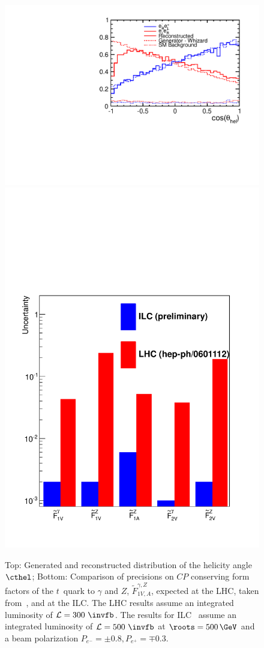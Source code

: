 \begin{figure}
\centering
\includegraphics[width=0.63\columnwidth]{Helicity_wbkg.pdf}
\includegraphics[width=0.63\columnwidth]{couplings.pdf}
\caption{
Top: Generated and reconstructed distribution of the helicity angle $\cthel$; 
Bottom: Comparison of precisions on $CP$ conserving form factors  
of the $t$~quark to $\gamma$ and $Z$, $\widetilde F^{\gamma,Z}_{1V,A}$,
expected at the LHC, taken from~\cite{Juste:2006sv}, and at the ILC. 
The LHC results assume an integrated luminosity of $\mathcal{L}=300~\invfb$.
The results for ILC~\cite{Amjad:2013hca} assume an integrated luminosity of $\mathcal{L}=500~\invfb$ at 
$\roots=500\,\GeV$ and a beam polarization  $P_{e^-} =\pm0.8,P_{e^+} = \mp0.3$.}
\label{fig:hel-coupl}
\end{figure}



